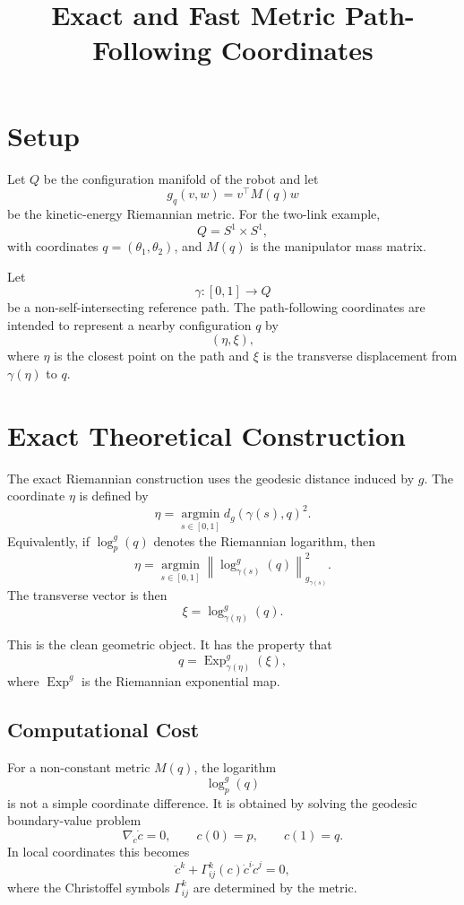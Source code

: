 \documentclass[11pt]{article}
\title{Exact and Fast Metric Path-Following Coordinates}
\author{}
\date{}
\begin{document}
\maketitle

\section{Setup}

Let \(Q\) be the configuration manifold of the robot and let
\[
    g_q(v,w) = v^\top M(q) w
\]
be the kinetic-energy Riemannian metric. For the two-link example,
\[
    Q = S^1 \times S^1,
\]
with coordinates \(q = (\theta_1,\theta_2)\), and \(M(q)\) is the manipulator
mass matrix.

Let
\[
    \gamma : [0,1] \to Q
\]
be a non-self-intersecting reference path. The path-following coordinates are
intended to represent a nearby configuration \(q\) by
\[
    (\eta,\xi),
\]
where \(\eta\) is the closest point on the path and \(\xi\) is the transverse
displacement from \(\gamma(\eta)\) to \(q\).

\section{Exact Theoretical Construction}

The exact Riemannian construction uses the geodesic distance induced by \(g\).
The coordinate \(\eta\) is defined by
\[
    \eta
    =
    \operatorname*{argmin}_{s \in [0,1]}
    d_g(\gamma(s),q)^2.
\]
Equivalently, if \(\log^g_p(q)\) denotes the Riemannian logarithm, then
\[
    \eta
    =
    \operatorname*{argmin}_{s \in [0,1]}
    \left\|
        \log^g_{\gamma(s)}(q)
    \right\|^2_{g_{\gamma(s)}}.
\]
The transverse vector is then
\[
    \xi
    =
    \log^g_{\gamma(\eta)}(q).
\]

This is the clean geometric object. It has the property that
\[
    q
    =
    \operatorname{Exp}^g_{\gamma(\eta)}(\xi),
\]
where \(\operatorname{Exp}^g\) is the Riemannian exponential map.

\subsection{Computational Cost}

For a non-constant metric \(M(q)\), the logarithm
\[
    \log^g_p(q)
\]
is not a simple coordinate difference. It is obtained by solving the geodesic
boundary-value problem
\[
    \nabla_{\dot c}\dot c = 0,
    \qquad
    c(0)=p,
    \qquad
    c(1)=q.
\]
In local coordinates this becomes
\[
    \ddot c^k
    +
    \Gamma^k_{ij}(c)\dot c^i \dot c^j
    =
    0,
\]
where the Christoffel symbols \(\Gamma^k_{ij}\) are determined by the metric.
\end{document}
